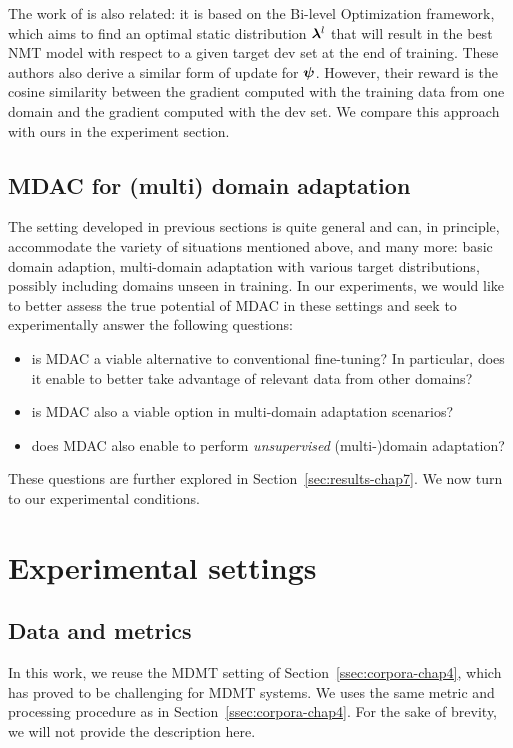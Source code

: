 The work of \citet{Wang20balancing} is also related: it is based on the Bi-level Optimization framework, which aims to find an optimal static distribution $\bm{\lambda}^{l}$ that will result in the best NMT model with respect to a given target dev set at the end of training. These authors also derive a similar form of update for $\bm{\psi}$. However, their reward is the cosine similarity between the gradient computed with the training data from one domain and the gradient computed with the dev set. We compare this approach with ours in the experiment section.

\subsection{MDAC for (multi) domain adaptation}
The setting developed in previous sections is quite general and can, in principle, accommodate the variety of situations mentioned above, and many more: basic domain adaption, multi-domain adaptation with various target distributions, possibly including domains unseen in training. In our experiments, we would like to better assess the true potential of MDAC in these settings and seek to experimentally answer the following questions:
\begin{itemize}
\item is MDAC a viable alternative to conventional fine-tuning? In particular, does it enable to better take advantage of relevant data from other domains?
\item is MDAC also a viable option in multi-domain adaptation scenarios?
\item does MDAC also enable to perform \emph{unsupervised} (multi-)domain adaptation? 
\end{itemize}
These questions are further explored in Section~\ref{sec:results-chap7}. We now turn to our experimental conditions.

\section{Experimental settings} \label{sec:exp-chap7}
\subsection{Data and metrics \label{ssec:corpora-chap7}}
In this work, we reuse the MDMT setting of Section~\ref{ssec:corpora-chap4}, which has proved to be challenging for MDMT systems. We uses the same metric and processing procedure as in Section~\ref{ssec:corpora-chap4}. For the sake of brevity, we will not provide the description here.

